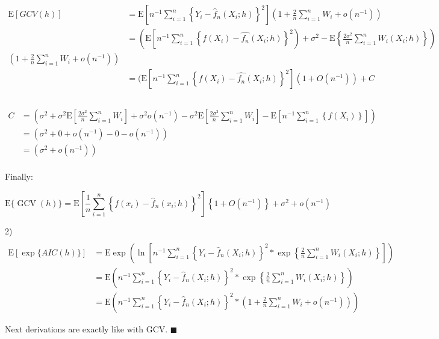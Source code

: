 \documentclass[11pt, oneside]{article}   	%
\begin{document}
\begin{equation*}
\begin{split}
\\
\mathrm{E}\left[G C V(h) \right] & = \mathrm{E}\left[n^{-1} \sum_{i=1}^n\left\{Y_i-\widehat{f}_n\left(X_i ; h\right)\right\}^2\right]\left( 1 + \frac{2}{n} \sum_{i=1}^n W_i + o(n^{-1}) \right)\\
& = \left(\mathrm{E}\left[n^{-1} \sum_{i=1}^n\left\{f\left(X_i\right)-\widehat{f_n}\left(X_i ; h\right)\right\}^2\right)+\sigma^2-\mathrm{E}\left\{\frac{2 \sigma^2}{n} \sum_{i=1}^n W_i\left(X_i ; h\right)\right\}\right) \\ 
\left( 1 + \frac{2}{n} \sum_{i=1}^n W_i + o(n^{-1}) \right)\\
& = (\mathrm{E}\left[n^{-1} \sum_{i=1}^n\left\{f\left(X_i\right)-\widehat{f_n}\left(X_i ; h\right)\right\}^2\right]\left( 1 + O(n^{-1}) \right) + C\\
\end{split}
\end{equation*} 

\begin{equation*}
\begin{split}
\\
C &= \left( \sigma^2 + \sigma^2 \mathrm{E}\left[ \frac{2 \sigma^2}{n} \sum_{i=1}^n W_i \right]  + \sigma^2o(n^{-1}) -\sigma^2    \mathrm{E}\left[ \frac{2 \sigma^2}{n} \sum_{i=1}^n W_i \right] - \mathrm{E}\left[n^{-1} \sum_{i=1}^n\left\{f\left(X_i\right)  \right\} \right] \right)\\
& = \left( \sigma^2 + 0 + o(n^{-1}) - 0 - o(n^{-1}) \right)\\
& = \left( \sigma^2 + o(n^{-1}) \right)\\
\end{split}
\end{equation*} 

Finally:

$$
\mathrm{E}\{\operatorname{GCV}(h)\}=\mathrm{E}\left[\frac{1}{n} \sum_{i=1}^n\left\{f\left(x_i\right)-\widehat{f}_n\left(x_i ; h\right)\right\}^2\right]\left\{1+O\left(n^{-1}\right)\right\}+\sigma^2+o\left(n^{-1}\right)
$$

2)
\begin{equation*}
\begin{split}
\\
\mathrm{E}[\exp \{A I C(h)\}] &= \mathrm{E} \exp \left(  \ln \left[n^{-1} \sum_{i=1}^n\left\{Y_i-\widehat{f}_n\left(X_i ; h\right)\right\}^2  * \exp \left\{ \frac{2}{n} \sum_{i=1}^n W_i\left(X_i ; h\right) \right\} \right]  \right)\\
& = \mathrm{E} \left(  n^{-1} \sum_{i=1}^n\left\{Y_i-\widehat{f}_n\left(X_i ; h\right)\right\}^2 * \exp \left\{ \frac{2}{n} \sum_{i=1}^n W_i\left(X_i ; h\right) \right\}  \right)\\
& = \mathrm{E} \left( n^{-1} \sum_{i=1}^n\left\{Y_i-\widehat{f}_n\left(X_i ; h\right)\right\}^2 * \left( 1 + \frac{2}{n} \sum_{i=1}^n W_i + o(n^{-1}) \right)  \right)
\end{split}
\end{equation*} 

Next derivations are exactly like with GCV.
\hfill\ensuremath{\blacksquare}
\end{document}
